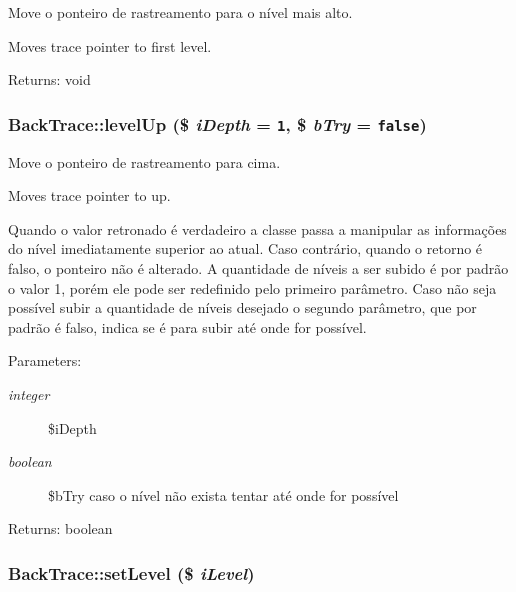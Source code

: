 Move o ponteiro de rastreamento para o nível mais alto.

Moves trace pointer to first level.

\begin{Desc}
\item[Returns:]void \end{Desc}
\hypertarget{class_back_trace_99b82e17be56fa564d20608296e0d994}{
\subsubsection[{levelUp}]{\setlength{\rightskip}{0pt plus 5cm}BackTrace::levelUp (\$ {\em iDepth} = {\tt 1}, \/  \$ {\em bTry} = {\tt false})}}
\label{class_back_trace_99b82e17be56fa564d20608296e0d994}


Move o ponteiro de rastreamento para cima.

Moves trace pointer to up.

Quando o valor retronado é verdadeiro a classe passa a manipular as informações do nível imediatamente superior ao atual. Caso contrário, quando o retorno é falso, o ponteiro não é alterado. A quantidade de níveis a ser subido é por padrão o valor 1, porém ele pode ser redefinido pelo primeiro parâmetro. Caso não seja possível subir a quantidade de níveis desejado o segundo parâmetro, que por padrão é falso, indica se é para subir até onde for possível.

\begin{Desc}
\item[Parameters:]
\begin{description}
\item[{\em integer}]\$iDepth \item[{\em boolean}]\$bTry caso o nível não exista tentar até onde for possível \end{description}
\end{Desc}
\begin{Desc}
\item[Returns:]boolean \end{Desc}
\hypertarget{class_back_trace_e6641538cbc2fbd659fe308c563bbc45}{
\subsubsection[{setLevel}]{\setlength{\rightskip}{0pt plus 5cm}BackTrace::setLevel (\$ {\em iLevel})}}
\label{class_back_trace_e6641538cbc2fbd659fe308c563bbc45}


